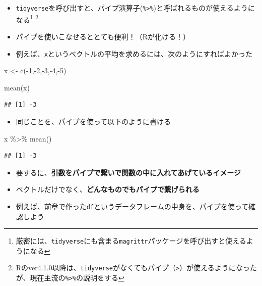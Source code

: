 \documentclass[
]{book}
\newenvironment{Shaded}{\begin{snugshade}}{\end{snugshade}}
\newcommand{\DecValTok}[1]{\textcolor[rgb]{0.00,0.00,0.81}{#1}}
\newcommand{\FunctionTok}[1]{\textcolor[rgb]{0.00,0.00,0.00}{#1}}
\newcommand{\NormalTok}[1]{#1}
\newcommand{\OtherTok}[1]{\textcolor[rgb]{0.56,0.35,0.01}{#1}}
\newcommand{\SpecialCharTok}[1]{\textcolor[rgb]{0.00,0.00,0.00}{#1}}
\providecommand{\tightlist}{%
  \setlength{\itemsep}{0pt}\setlength{\parskip}{0pt}}
\begin{document}
\begin{itemize}
\tightlist
\item
  \texttt{tidyverse}を呼び出すと、パイプ演算子(\texttt{\%\textgreater{}\%})と呼ばれるものが使えるようになる\footnote{厳密には、\texttt{tidyverse}にも含まる\texttt{magrittr}パッケージを呼び出すと使えるようになる} \footnote{Rのver4.1.0以降は、\texttt{tidyverse}がなくてもパイプ（\texttt{\textbar{}\textgreater{}}）が使えるようになったが、現在主流の\texttt{\%\textgreater{}\%}の説明をする}
\item
  パイプを使いこなせるととても便利！（Rが化ける！）
\item
  例えば、\texttt{x}というベクトルの平均を求めるには、次のようにすればよかった
\end{itemize}

\begin{Shaded}
\begin{Highlighting}[]
\NormalTok{x }\OtherTok{\textless{}{-}} \FunctionTok{c}\NormalTok{(}\SpecialCharTok{{-}}\DecValTok{1}\NormalTok{,}\SpecialCharTok{{-}}\DecValTok{2}\NormalTok{,}\SpecialCharTok{{-}}\DecValTok{3}\NormalTok{,}\SpecialCharTok{{-}}\DecValTok{4}\NormalTok{,}\SpecialCharTok{{-}}\DecValTok{5}\NormalTok{)}

\FunctionTok{mean}\NormalTok{(x)}
\end{Highlighting}
\end{Shaded}

\begin{verbatim}
## [1] -3
\end{verbatim}

\begin{itemize}
\tightlist
\item
  同じことを、パイプを使って以下のように書ける
\end{itemize}

\begin{Shaded}
\begin{Highlighting}[]
\NormalTok{x }\SpecialCharTok{\%\textgreater{}\%} \FunctionTok{mean}\NormalTok{()}
\end{Highlighting}
\end{Shaded}

\begin{verbatim}
## [1] -3
\end{verbatim}

\begin{itemize}
\tightlist
\item
  要するに、\textbf{引数をパイプで繋いで関数の中に入れてあげているイメージ}
\item
  ベクトルだけでなく、\textbf{どんなものでもパイプで繋げられる}
\item
  例えば、前章で作った\texttt{df}というデータフレームの中身を、パイプを使って確認しよう
\end{itemize}
\end{document}
